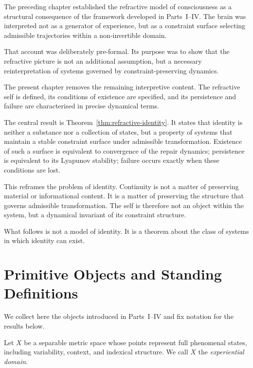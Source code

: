 \documentclass[11pt,openany]{book}
\begin{document}
The preceding chapter established the refractive model of
consciousness as a structural consequence of the framework
developed in Parts~I--IV.  The brain was interpreted not as
a generator of experience, but as a constraint surface
selecting admissible trajectories within a non-invertible
domain.

That account was deliberately pre-formal.  Its purpose was
to show that the refractive picture is not an additional
assumption, but a necessary reinterpretation of systems
governed by constraint-preserving dynamics.

The present chapter removes the remaining interpretive
content.  The refractive self is defined, its conditions
of existence are specified, and its persistence and failure
are characterised in precise dynamical terms.

The central result is Theorem~\ref{thm:refractive-identity}.
It states that identity is neither a substance nor a
collection of states, but a property of systems that
maintain a stable constraint surface under admissible
transformation.  Existence of such a surface is equivalent
to convergence of the repair dynamics; persistence is
equivalent to its Lyapunov stability; failure occurs
exactly when these conditions are lost.

This reframes the problem of identity.  Continuity is not
a matter of preserving material or informational content.
It is a matter of preserving the structure that governs
admissible transformation.  The self is therefore not an
object within the system, but a dynamical invariant of its
constraint structure.

What follows is not a model of identity.  It is a theorem
about the class of systems in which identity can exist.

\section{Primitive Objects and Standing Definitions}
\label{sec:primitives}

We collect here the objects introduced in Parts~I--IV and fix
notation for the results below.

\begin{definition}
Let $X$ be a separable metric space whose points represent
full phenomenal states, including variability, context, and
indexical structure.  We call $X$ the \emph{experiential
domain}.
\end{definition}
\end{document}
